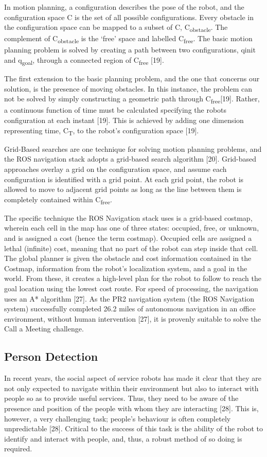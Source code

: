 \documentclass{article}
\begin{document}
In motion planning, a configuration describes the pose of the robot, and the configuration space C is the set of all possible configurations. Every obstacle in the configuration space can be mapped to a subset of C, C\textsubscript{obstacle}. The complement of C\textsubscript{obstacle} is the ‘free’ space and labelled C\textsubscript{free}. The basic motion planning problem is solved by creating a path between two configurations, qinit and q\textsubscript{goal}, through a connected region of C\textsubscript{free} [19].

The first extension to the basic planning problem, and the one that concerns our solution, is the presence of moving obstacles. In this instance, the problem can not be solved by simply constructing a geometric path through C\textsubscript{free}[19]. Rather, a continuous function of time must be calculated specifying the robots configuration at each instant [19]. This is achieved by adding one dimension representing time, C\textsubscript{T}, to the robot’s configuration space [19].

Grid-Based searches are one technique for solving motion planning problems, and the ROS navigation stack adopts a grid-based search algorithm [20]. Grid-based approaches overlay a grid on the configuration space, and assume each configuration is identified with a grid point. At each grid point, the robot is allowed to move to adjacent grid points as long as the line between them is completely contained within C\textsubscript{free}.

The specific technique the ROS Navigation stack uses is a grid-based costmap, wherein each cell in the map has one of three states: occupied, free, or unknown, and is assigned a cost (hence the term costmap). Occupied cells are assigned a lethal (infinite) cost, meaning that no part of the robot can step inside that cell. The global planner is given the obstacle and cost information contained in the Costmap, information from the robot’s localization system, and a goal in the world. From these, it creates a high-level plan for the robot to follow to reach the goal location using the lowest cost route. For speed of processing, the navigation uses an A* algorithm [27]. As the PR2 navigation system (the ROS Navigation system) successfully completed 26.2 miles of autonomous navigation in an office environment, without human intervention [27], it is provenly suitable to solve the Call a Meeting challenge.

\subsection{Person Detection}
In recent years, the social aspect of service robots has made it clear that they are not only expected to navigate within their environment but also to interact with people so as to provide useful services.  Thus, they need to be aware of the presence and position of the people with whom they are interacting [28]. This is, however, a very challenging task; people’s behaviour is often completely unpredictable [28]. Critical to the success of this task is the ability of the robot to identify and interact with people, and, thus, a robust method of so doing is required.
\end{document}
